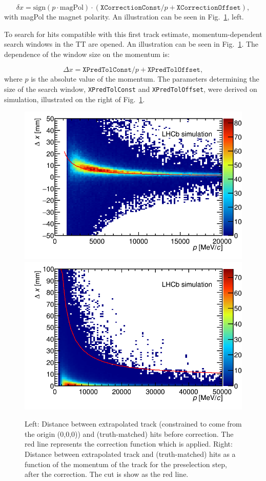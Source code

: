 \begin{equation}
\delta x = \text{sign}(p\cdot \text{magPol}) \cdot \left( \texttt{XCorrectionConst} / p + \texttt{XCorrectionOffset} \right),
\end{equation}
with magPol the magnet polarity. An illustration can be seen in
Fig.~\ref{fig:preselWindow}, left. 
 
To search for hits compatible with this first track estimate, momentum-dependent
search windows in the TT are opened.
An illustration can be seen in Fig.~\ref{fig:preselWindow}. The
dependence of the window size on the momentum is:

\begin{equation}
\Delta x = \texttt{XPredTolConst} / p + \texttt{XPredTolOffset},
\end{equation}
where $p$ is the absolute value of the momentum. The parameters determining the
size of the search window, \texttt{XPredTolConst} and
\texttt{XPredTolOffset}, were derived on simulation, illustrated on the right of
Fig.~\ref{fig:preselWindow}.

\begin{figure}[!htbp]
 \begin{center}
  \includegraphics[width=0.49\linewidth]{figures/xPosCorrection1.png}
   \includegraphics[width=0.49\linewidth]{figures/preselWindow1.png}
   \caption{Left: Distance between extrapolated track (constrained to come from the \lhcb origin (0,0,0)) and (truth-matched) hits
   before correction. The red line represents the correction function which is
   applied. Right: Distance between extrapolated track and (truth-matched) hits
   as a function of the momentum of the track for the preselection step, after
   the correction. The cut is show as the red line.
     \label{fig:preselWindow}}
 \end{center}
\end{figure}



